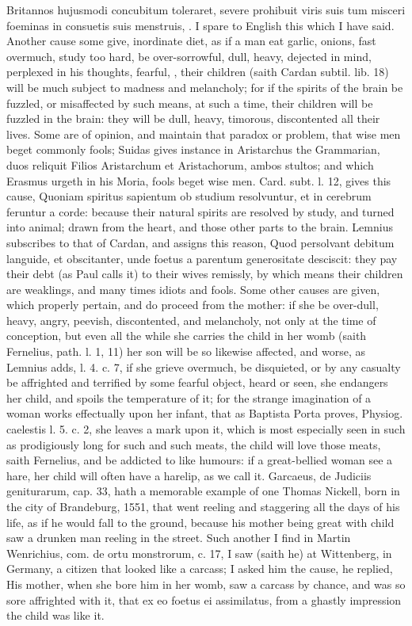 {{Britannos hujusmodi concubitum toleraret, severe prohibuit viris
suis tum misceri foeminas in consuetis suis menstruis, \etc{}. I spare to
English this which I have said. Another cause some give, inordinate
diet, as if a man eat garlic, onions, fast overmuch, study too hard, be
over-sorrowful, dull, heavy, dejected in mind, perplexed in his
thoughts, fearful, \etc{}, their children (saith Cardan subtil. lib.
18) will be much subject to madness and melancholy; for if the spirits
of the brain be fuzzled, or misaffected by such means, at such a time,
their children will be fuzzled in the brain: they will be dull, heavy,
timorous, discontented all their lives. Some are of opinion, and
maintain that paradox or problem, that wise men beget commonly fools;
Suidas gives instance in Aristarchus the Grammarian, duos reliquit
Filios Aristarchum et Aristachorum, ambos stultos; and which
Erasmus urgeth in his Moria, fools beget wise men. Card. subt. l.
12, gives this cause, Quoniam spiritus sapientum ob studium
resolvuntur, et in cerebrum feruntur a corde: because their natural
spirits are resolved by study, and turned into animal; drawn from the
heart, and those other parts to the brain. Lemnius subscribes to that
of Cardan, and assigns this reason, Quod persolvant debitum languide,
et obscitanter, unde foetus a parentum generositate desciscit: they pay
their debt (as Paul calls it) to their wives remissly, by which means
their children are weaklings, and many times idiots and fools.
Some other causes are given, which properly pertain, and do proceed
from the mother: if she be over-dull, heavy, angry, peevish,
discontented, and melancholy, not only at the time of conception, but
even all the while she carries the child in her womb (saith Fernelius,
path. l. 1, 11) her son will be so likewise affected, and worse, as
Lemnius adds, l. 4. c. 7, if she grieve overmuch, be disquieted,
or by any casualty be affrighted and terrified by some fearful object,
heard or seen, she endangers her child, and spoils the temperature of
it; for the strange imagination of a woman works effectually upon her
infant, that as Baptista Porta proves, Physiog. caelestis l. 5. c. 2,
she leaves a mark upon it, which is most especially seen in such as
prodigiously long for such and such meats, the child will love those
meats, saith Fernelius, and be addicted to like humours: if a
great-bellied woman see a hare, her child will often have a harelip, as
we call it. Garcaeus, de Judiciis geniturarum, cap. 33, hath a
memorable example of one Thomas Nickell, born in the city of
Brandeburg, 1551, that went reeling and staggering all the days
of his life, as if he would fall to the ground, because his mother
being great with child saw a drunken man reeling in the street. Such
another I find in Martin Wenrichius, com. de ortu monstrorum, c. 17, I
saw (saith he) at Wittenberg, in Germany, a citizen that looked like a
carcass; I asked him the cause, he replied, His mother, when she
bore him in her womb, saw a carcass by chance, and was so sore
affrighted with it, that ex eo foetus ei assimilatus, from a ghastly
impression the child was like it.

}}
